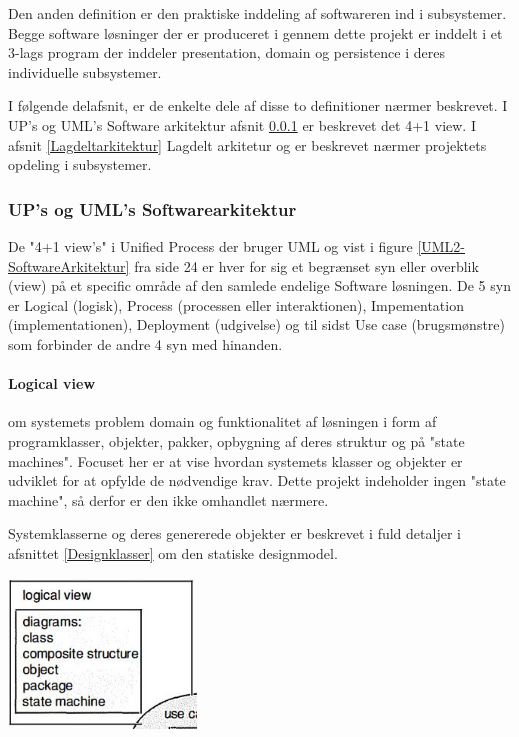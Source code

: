Den anden definition er den praktiske inddeling af softwareren ind i subsystemer. Begge software løsninger der er produceret i gennem dette projekt er inddelt i et 3-lags program der inddeler presentation, domain og persistence i deres individuelle subsystemer. 

I følgende delafsnit, er de enkelte dele af disse to definitioner nærmer beskrevet. I UP's og UML's Software arkitektur afsnit \ref{Softwarearkitektur} er beskrevet det 4+1 view. I afsnit \ref{Lagdeltarkitektur} Lagdelt arkitetur og  er beskrevet nærmer projektets opdeling i subsystemer.

\subsubsection{UP's og UML's Softwarearkitektur} \label{Softwarearkitektur}
De "4+1 view's" i Unified Process der bruger UML og vist i figure \ref{UML2-SoftwareArkitektur} fra \cite{A&N} side 24 er hver for sig et begrænset syn eller overblik (view) på et specific område af den samlede endelige Software løsningen. De 5 syn er Logical (logisk), Process (processen eller interaktionen), Impementation (implementationen), Deployment (udgivelse) og til sidst Use case (brugsmønstre) som forbinder de andre 4 syn med hinanden. 

\paragraph{Logical view} om systemets problem domain og funktionalitet af løsningen i form af programklasser, objekter, pakker, opbygning af deres struktur og på "state machines". Focuset her er at vise hvordan systemets klasser og objekter er udviklet for at opfylde de nødvendige krav. Dette projekt indeholder ingen "state machine", så derfor er den ikke omhandlet nærmere.

Systemklasserne og deres genererede objekter er beskrevet i fuld detaljer i afsnittet \ref{Designklasser} om den statiske designmodel.

 	 \includegraphics[width=5cm]{elaborationsdokumentet/figurer/design/soft-ark/UML2-LogicView.JPG}

